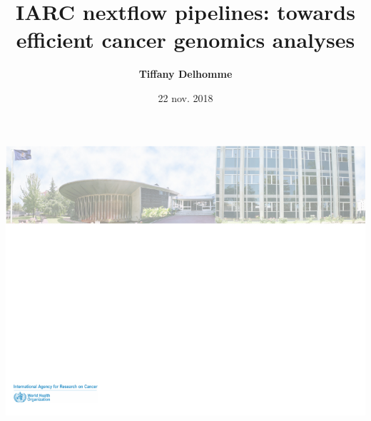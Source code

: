 \documentclass[xcolor=table,compress]{beamer} %
\title[nextflow workshop 2018]{IARC nextflow pipelines: towards efficient cancer genomics analyses}
\author{\textbf{Tiffany Delhomme}} %
\institute[] %
{ \small PhD student at IARC(WHO) \\ \vspace*{0.25cm}
\medskip
\textit{} %
}
\date{22 nov. 2018} %
\begin{document}
\usebackgroundtemplate%
{%
    \includegraphics[width=\paperwidth,height=\paperheight]{pictures/back_slide_1.pdf}%
}

\begin{frame}[noframenumbering]
\titlepage %
\end{frame}
\end{document}
